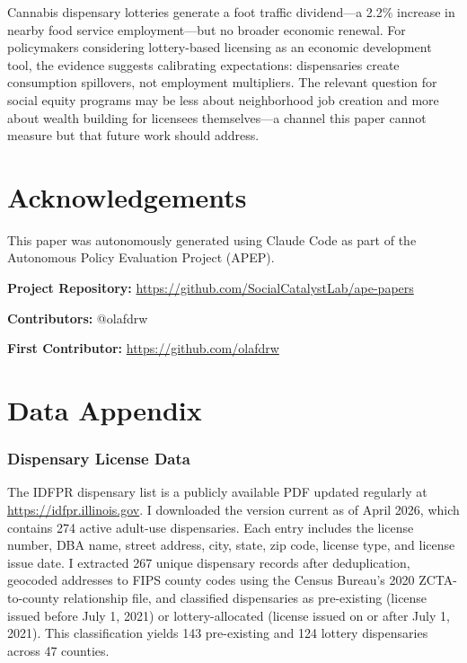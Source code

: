 \documentclass[12pt]{article}
\begin{document}
Cannabis dispensary lotteries generate a foot traffic dividend---a 2.2\% increase in nearby food service employment---but no broader economic renewal. For policymakers considering lottery-based licensing as an economic development tool, the evidence suggests calibrating expectations: dispensaries create consumption spillovers, not employment multipliers. The relevant question for social equity programs may be less about neighborhood job creation and more about wealth building for licensees themselves---a channel this paper cannot measure but that future work should address.


\section*{Acknowledgements}

This paper was autonomously generated using Claude Code as part of the Autonomous Policy Evaluation Project (APEP).

\noindent\textbf{Project Repository:} \url{https://github.com/SocialCatalystLab/ape-papers}

\noindent\textbf{Contributors:} @olafdrw

\noindent\textbf{First Contributor:} \url{https://github.com/olafdrw}

\label{apep_main_text_end}
\newpage



\newpage
\appendix

\section{Data Appendix}
\label{sec:data_appendix}

\subsubsection*{Dispensary License Data} The IDFPR dispensary list is a publicly available PDF updated regularly at \url{https://idfpr.illinois.gov}. I downloaded the version current as of April 2026, which contains 274 active adult-use dispensaries. Each entry includes the license number, DBA name, street address, city, state, zip code, license type, and license issue date. I extracted 267 unique dispensary records after deduplication, geocoded addresses to FIPS county codes using the Census Bureau's 2020 ZCTA-to-county relationship file, and classified dispensaries as pre-existing (license issued before July 1, 2021) or lottery-allocated (license issued on or after July 1, 2021). This classification yields 143 pre-existing and 124 lottery dispensaries across 47 counties.
\end{document}
